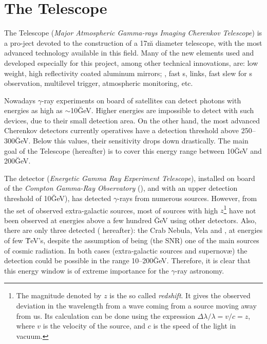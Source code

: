 
\chapter{The \MAGIC Telescope}
\label{chapter:magic}

The  Telescope (\emph{Major Atmospheric Gamma-rays Imaging
  Cherenkov Telescope}) is a pro-ject devoted to the construction
of a 17\u{m} diameter \Cherenkov telescope, with the most advanced
technology available in this field. Many of the new elements used and
developed especially for this project, among other technical
innovations, are: low weight, high reflectivity coated aluminum
mirrors; , fast s,  links, fast slew for s observation, multilevel
trigger, atmospheric monitoring, etc.

Nowadays $\gamma$-ray experiments on board of satellites can detect
photons with energies as high as $\sim$10\u{GeV}. Higher energies
are impossible to detect with such devices, due to their small
detection area. On the other hand, the most advanced Cherenkov
detectors currently operatives have a detection threshold above
250--300\u{GeV}.  Below this values, their sensitivity drops down
drastically. The main goal of the \MAGIC Telescope (\MAGIC hereafter)
is to cover this energy range between 10\u{GeV} and 200\u{GeV}.
%
\energygapfig

The detector  (\emph{Energetic Gamma Ray Experiment
  Telescope}), installed on board of the \emph{Compton Gamma-Ray
  Observatory} (), and with an upper detection threshold of
10\u{GeV}), has detected $\gamma$-rays from numerous sources.
However, from the set of observed extra-galactic
sources, most of sources with high %
%
$z$\footnote{The magnitude denoted by $z$ is the so called
  \emph{redshift}.  It gives the observed deviation in the wavelength
  from a wave coming from a source moving away from us. Its
  calculation can be done using the expression
  $\Delta\lambda/\lambda=v/c=z$, where $v$ is the velocity of the
  source, and $c$ is the speed of
  the light in vacuum.} %
%
have not been observed at energies above a few hundred \u{GeV} using
other detectors. Also, there are only three detected
\emph{} ( hereafter): the Crab
Nebula, Vela and , at energies of few \u{TeV}'s, despite
the assumption of being (the SNR) one of the main sources of cosmic
radiation.  In both cases (extra-galactic sources and supernov\ae) the
detection could be possible in the range 10--200\u{GeV}.  Therefore,
it is clear that this energy window is of extreme importance for the
$\gamma$-ray astronomy.

